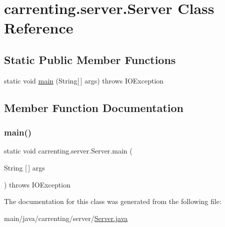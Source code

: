 \hypertarget{classcarrenting_1_1server_1_1_server}{}\section{carrenting.\+server.\+Server Class Reference}
\label{classcarrenting_1_1server_1_1_server}
\subsection*{Static Public Member Functions}
\begin{DoxyCompactItemize}
\item 
static void \mbox{\hyperlink{classcarrenting_1_1server_1_1_server_a96530d72cb356121f0a1341503b34b6a}{main}} (String\mbox{[}$\,$\mbox{]} args)  throws I\+O\+Exception 
\end{DoxyCompactItemize}


\subsection{Member Function Documentation}
\mbox{\label{classcarrenting_1_1server_1_1_server_a96530d72cb356121f0a1341503b34b6a}} 
\subsubsection{\texorpdfstring{main()}{main()}}
{\footnotesize\ttfamily static void carrenting.\+server.\+Server.\+main (\begin{DoxyParamCaption}\item[{String \mbox{[}$\,$\mbox{]}}]{args }\end{DoxyParamCaption}) throws I\+O\+Exception\hspace{0.3cm}{\ttfamily [static]}}



The documentation for this class was generated from the following file\+:\begin{DoxyCompactItemize}
\item 
main/java/carrenting/server/\mbox{\hyperlink{_server_8java}{Server.\+java}}\end{DoxyCompactItemize}
